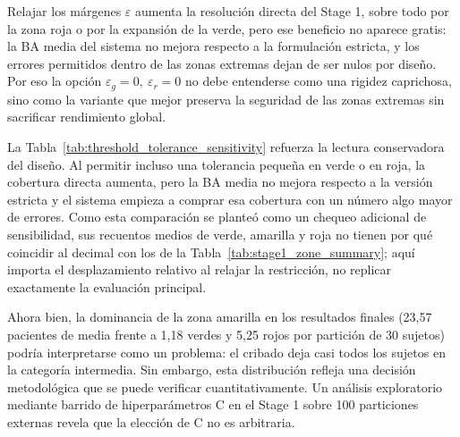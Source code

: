 Relajar los márgenes $\varepsilon$ aumenta la resolución directa del Stage 1, sobre todo por la zona roja o por la expansión de la verde, pero ese beneficio no aparece gratis: la BA media del sistema no mejora respecto a la formulación estricta, y los errores permitidos dentro de las zonas extremas dejan de ser nulos por diseño. Por eso la opción $\varepsilon_g=0,\ \varepsilon_r=0$ no debe entenderse como una rigidez caprichosa, sino como la variante que mejor preserva la seguridad de las zonas extremas sin sacrificar rendimiento global.

\begin{table}[ht]
\centering
\caption{Sensibilidad del Stage 1 a versiones más tolerantes de la restricción de errores extremos.}
\label{tab:threshold_tolerance_sensitivity}
\small
\setlength{\tabcolsep}{4pt}
\end{table}

La Tabla~\ref{tab:threshold_tolerance_sensitivity} refuerza la lectura conservadora del diseño. Al permitir incluso una tolerancia pequeña en verde o en roja, la cobertura directa aumenta, pero la BA media no mejora respecto a la versión estricta y el sistema empieza a comprar esa cobertura con un número algo mayor de errores. Como esta comparación se planteó como un chequeo adicional de sensibilidad, sus recuentos medios de verde, amarilla y roja no tienen por qué coincidir al decimal con los de la Tabla~\ref{tab:stage1_zone_summary}; aquí importa el desplazamiento relativo al relajar la restricción, no replicar exactamente la evaluación principal.

Ahora bien, la dominancia de la zona amarilla en los resultados finales (23,57 pacientes de media frente a 1,18 verdes y 5,25 rojos por partición de 30 sujetos) podría interpretarse como un problema: el cribado deja casi todos los sujetos en la categoría intermedia. Sin embargo, esta distribución refleja una decisión metodológica que se puede verificar cuantitativamente. Un análisis exploratorio mediante barrido de hiperparámetros C en el Stage 1 sobre 100 particiones externas revela que la elección de C no es arbitraria.

